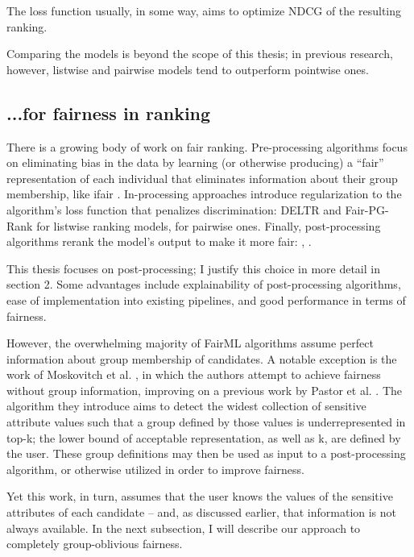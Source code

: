 The loss function usually, in some way, aims to optimize NDCG of the resulting ranking.

Comparing the models is beyond the scope of this thesis; in previous research, however, listwise \cite{10.1145/2866571} and pairwise \cite{RankNet} models tend to outperform pointwise ones.

\subsection{...for fairness in ranking}

There is a growing body of work on fair ranking. Pre-processing algorithms focus on eliminating bias in the data by learning (or otherwise producing) a “fair” representation of each individual that eliminates information about their group membership, like ifair \cite{ifair}. In-processing approaches introduce regularization to the algorithm’s loss function that penalizes discrimination: DELTR and Fair-PG-Rank for listwise ranking models, \cite{beutelpairwise} for pairwise ones. Finally, post-processing algorithms rerank the model’s output to make it more fair: \cite{linkedin}, \cite{RAPF}.

This thesis focuses on post-processing; I justify this choice in more detail in section 2. Some advantages include explainability of post-processing algorithms, ease of implementation into existing pipelines, and good performance in terms of fairness.

However, the overwhelming majority of FairML algorithms assume perfect information about group membership of candidates. A notable exception is the work of Moskovitch et al. \cite{detectionofgroups}, in which the authors attempt to achieve fairness without group information, improving on a previous work by Pastor et al. \cite{https://arxiv.org/abs/2108.07450}. The algorithm they introduce aims to detect the widest collection of sensitive attribute values such that a group defined by those values is underrepresented in top-k; the lower bound of acceptable representation, as well as k, are defined by the user. These group definitions may then be used as input to a post-processing algorithm, or otherwise utilized in order to improve fairness.

Yet this work, in turn, assumes that the user knows the values of the sensitive attributes of each candidate – and, as discussed earlier, that information is not always available. In the next subsection, I will describe our approach to completely group-oblivious fairness.

